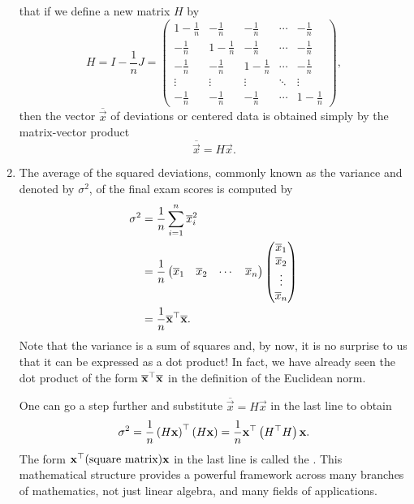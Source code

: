 \documentclass{ximera}
\begin{document}
\begin{example}
\begin{enumerate}
    that if we define a new matrix $H$ by
    \[
      H = I - \frac{1}{n} J =
      \begin{pmatrix}
        1-\frac{1}{n} & -\frac{1}{n} & -\frac{1}{n} & \cdots & -\frac{1}{n} \\
        -\frac{1}{n} & 1-\frac{1}{n} & -\frac{1}{n} & \cdots & -\frac{1}{n} \\
        -\frac{1}{n} & -\frac{1}{n} & 1-\frac{1}{n} & \cdots & -\frac{1}{n} \\
        \vdots & \vdots & \vdots & \ddots & \vdots \\
        -\frac{1}{n} & -\frac{1}{n} & -\frac{1}{n} & \cdots & 1-\frac{1}{n}
      \end{pmatrix},
    \]
    then the vector $\overline{\vec{x}}$ of deviations or centered
    data is obtained simply by the matrix-vector product
    \[
      \overline{\vec{x}} = H\vec{x}.
    \]
  \item The average of the squared deviations, commonly known as the
    variance and denoted by $\sigma^2$, of the final exam scores is
    computed by
    \begin{align*}
      \sigma^2
      & = \frac{1}{n} \sum_{i=1}^n \overline{x}_i^2 \\
      & = \frac{1}{n}
        \begin{pmatrix}
          \overline{x}_1 & \overline{x}_2 & \cdots & \overline{x}_n
        \end{pmatrix}
        \begin{pmatrix}
          \overline{x}_1 \\ \overline{x}_2 \\ \vdots \\ \overline{x}_n
        \end{pmatrix} \\
      & = \frac{1}{n} \overline{\mathbf{x}}^\top \overline{\mathbf{x}}.
    \end{align*}
    Note that the variance is a sum of squares and, by now, it is no
    surprise to us that it can be expressed as a dot product! In fact,
    we have already seen the dot product of the form
    $\overline{\mathbf{x}}^\top \overline{\mathbf{x}}$ in the
    definition of the Euclidean norm.

    One can go a step further and substitute
    $\overline{\vec{x}} = H \vec{x}$ in the last line to obtain
    \[
      \sigma^2
      = \frac{1}{n} \left( H \mathbf{x} \right)^\top \left( H
        \mathbf{x} \right)
      = \frac{1}{n} \mathbf{x}^\top \left( H^\top H \right) \mathbf{x}.
    \]
    The form $\mathbf{x}^\top \text{(square matrix)} \mathbf{x}$ in
    the last line is called the \textit{}. This
    mathematical structure provides a powerful framework across many
    branches of mathematics, not just linear algebra, and many fields
    of applications.
  \end{enumerate}
\end{example}
\end{document}
